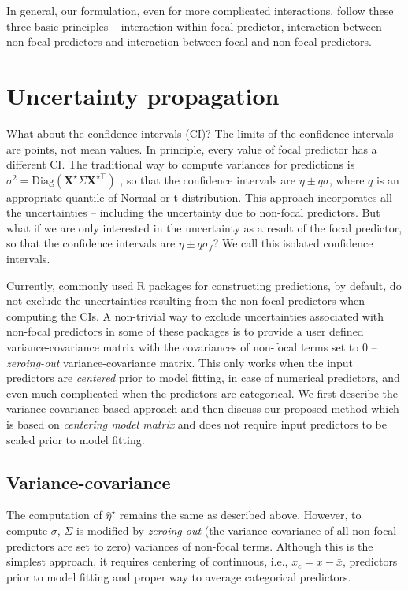 \documentclass[10pt,letterpaper]{article}
\let\proglang=\textsf
\newcommand{\bX}{{\mathbf X}}
\begin{document}
In general, our formulation, even for more complicated interactions, follow these three basic principles -- interaction within focal predictor, interaction between non-focal predictors and interaction between focal and non-focal predictors.


\section*{Uncertainty propagation}

What about the confidence intervals (CI)? The limits of the confidence intervals are points, not mean values. In principle, every value of focal predictor has a different CI. The traditional way to compute variances for predictions is $\sigma^2 = \textrm{Diag}(\bX^\star \Sigma \bX^{\star\top})$ \cite{lenth2018package, fox2009effect}, so that the confidence intervals are $\eta \pm q\sigma$, where $q$ is an appropriate quantile of Normal or t distribution. This approach incorporates all the uncertainties -- including the uncertainty due to non-focal predictors.  But what if we are only interested in the uncertainty as a result of the focal predictor, so that the confidence intervals are $\eta \pm q \sigma_f$? We call this isolated confidence intervals.

Currently, commonly used \proglang{R} packages for constructing predictions, by default, do not exclude the uncertainties resulting from the non-focal predictors when computing the CIs. A non-trivial way to exclude uncertainties associated with non-focal predictors in some of these packages is to provide a user defined variance-covariance matrix with the covariances of non-focal terms set to $0$ -- \emph{zeroing-out} variance-covariance matrix. This only works when the input predictors are \emph{centered} prior to model fitting, in case of numerical predictors, and even much complicated when the predictors are categorical. We first describe the variance-covariance based approach and then discuss our proposed method which is based on \emph{centering model matrix} and does not require input predictors to be scaled prior to model fitting.


\subsection*{Variance-covariance}

The computation of $\hat{\eta}^\star$ remains the same as described above. However, to compute $\sigma$, $\Sigma$ is modified by \emph{zeroing-out} (the variance-covariance of all non-focal predictors are set to zero) variances of non-focal terms. Although this is the simplest approach, it requires centering of continuous, i.e., $x_c = x - \bar{x}$, predictors prior to model fitting and proper way to average categorical predictors.
\end{document}
